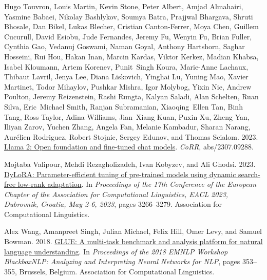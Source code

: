 \documentclass[11pt,dvipsnames]{article}
\begin{document}
{\begin{thebibliography}{73}
Hugo Touvron, Louis Martin, Kevin Stone, Peter Albert, Amjad Almahairi, Yasmine
  Babaei, Nikolay Bashlykov, Soumya Batra, Prajjwal Bhargava, Shruti Bhosale,
  Dan Bikel, Lukas Blecher, Cristian Canton{-}Ferrer, Moya Chen, Guillem
  Cucurull, David Esiobu, Jude Fernandes, Jeremy Fu, Wenyin Fu, Brian Fuller,
  Cynthia Gao, Vedanuj Goswami, Naman Goyal, Anthony Hartshorn, Saghar
  Hosseini, Rui Hou, Hakan Inan, Marcin Kardas, Viktor Kerkez, Madian Khabsa,
  Isabel Kloumann, Artem Korenev, Punit~Singh Koura, Marie{-}Anne Lachaux,
  Thibaut Lavril, Jenya Lee, Diana Liskovich, Yinghai Lu, Yuning Mao, Xavier
  Martinet, Todor Mihaylov, Pushkar Mishra, Igor Molybog, Yixin Nie, Andrew
  Poulton, Jeremy Reizenstein, Rashi Rungta, Kalyan Saladi, Alan Schelten, Ruan
  Silva, Eric~Michael Smith, Ranjan Subramanian, Xiaoqing~Ellen Tan, Binh Tang,
  Ross Taylor, Adina Williams, Jian~Xiang Kuan, Puxin Xu, Zheng Yan, Iliyan
  Zarov, Yuchen Zhang, Angela Fan, Melanie Kambadur, Sharan Narang,
  Aur{\'{e}}lien Rodriguez, Robert Stojnic, Sergey Edunov, and Thomas Scialom.
  2023.
\newblock \href {https://doi.org/10.48550/arXiv.2307.09288} {Llama 2: Open
  foundation and fine-tuned chat models}.
\newblock \emph{CoRR}, abs/2307.09288.

Mojtaba Valipour, Mehdi Rezagholizadeh, Ivan Kobyzev, and Ali Ghodsi. 2023.
\newblock \href {https://doi.org/10.18653/V1/2023.EACL-MAIN.239} {{DyLoRA}:
  Parameter-efficient tuning of pre-trained models using dynamic search-free
  low-rank adaptation}.
\newblock In \emph{Proceedings of the 17th Conference of the European Chapter
  of the Association for Computational Linguistics, {EACL} 2023, Dubrovnik,
  Croatia, May 2-6, 2023}, pages 3266--3279. Association for Computational
  Linguistics.

Alex Wang, Amanpreet Singh, Julian Michael, Felix Hill, Omer Levy, and Samuel
  Bowman. 2018.
\newblock \href {https://doi.org/10.18653/v1/W18-5446} {{GLUE}: A multi-task
  benchmark and analysis platform for natural language understanding}.
\newblock In \emph{Proceedings of the 2018 {EMNLP} Workshop {B}lackbox{NLP}:
  Analyzing and Interpreting Neural Networks for {NLP}}, pages 353--355,
  Brussels, Belgium. Association for Computational Linguistics.


\end{thebibliography}}
\end{document}
